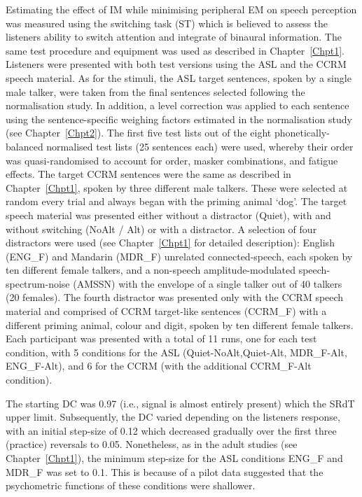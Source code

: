 \documentclass[a4paper, twoside]{templates/ociamthesis}
\begin{document}
\hfill\break
Estimating the effect of IM while minimising peripheral EM on speech perception was measured using the switching task (ST) which is believed to assess the listeners ability to switch attention and integrate of binaural information. The same test procedure and equipment was used as described in Chapter~\ref{Chpt1}. Listeners were presented with both test versions using the ASL and the CCRM speech material. As for the stimuli, the ASL target sentences, spoken by a single male talker, were taken from the final sentences selected following the normalisation study. In addition, a level correction was applied to each sentence using the sentence-specific weighing factors estimated in the normalisation study (see Chapter~\ref{Chpt2}). The first five test lists out of the eight phonetically-balanced normalised test lists (25 sentences each) were used, whereby their order was quasi-randomised to account for order, masker combinations, and fatigue effects. The target CCRM sentences were the same as described in Chapter~\ref{Chpt1}, spoken by three different male talkers. These were selected at random every trial and always began with the priming animal `dog'. The target speech material was presented either without a distractor (Quiet), with and without switching (NoAlt / Alt) or with a distractor. A selection of four distractors were used (see Chapter~\ref{Chpt1} for detailed description): English (ENG\_F) and Mandarin (MDR\_F) unrelated connected-speech, each spoken by ten different female talkers, and a non-speech amplitude-modulated speech-spectrum-noise (AMSSN) with the envelope of a single talker out of 40 talkers (20 females). The fourth distractor was presented only with the CCRM speech material and comprised of CCRM target-like sentences (CCRM\_F) with a different priming animal, colour and digit, spoken by ten different female talkers. Each participant was presented with a total of 11 runs, one for each test condition, with 5 conditions for the ASL (Quiet-NoAlt,Quiet-Alt, MDR\_F-Alt, ENG\_F-Alt), and 6 for the CCRM (with the additional CCRM\_F-Alt condition).

\begin{correction}
The starting DC was 0.97 (i.e., signal is almost entirely present) which
the SRdT upper limit. Subsequently, the DC varied depending on the
listeners response, with an initial step-size of 0.12 which decreased
gradually over the first three (practice) reversals to 0.05.
Nonetheless, as in the adult studies (see Chapter~\ref{Chpt1}), the
minimum step-size for the ASL conditions ENG\_F and MDR\_F was set to
0.1. This is because of a pilot data suggested that the psychometric
functions of these conditions were shallower.
\end{correction}
\end{document}

